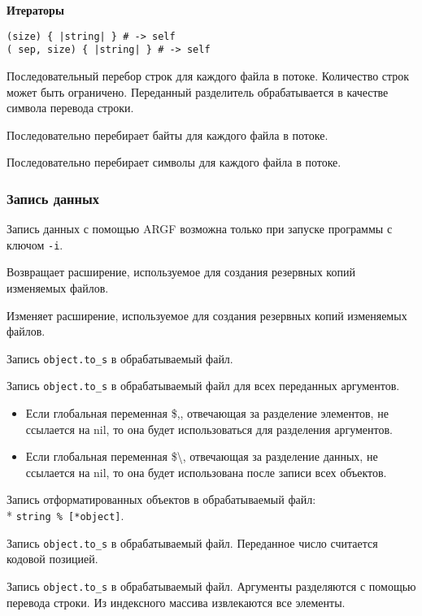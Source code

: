 {\bf Итераторы}

\begin{methodlist}
  \verb!(size) { |string| } # -> self!
  \\\verb!( sep, size) { |string| } # -> self!

  Последовательный перебор строк для каждого файла в потоке. Количество строк может быть ограничено. Переданный разделитель обрабатывается в качестве символа перевода строки.
 
  Последовательно перебирает байты для каждого файла в потоке. 

  Последовательно перебирает символы для каждого файла в потоке.
\end{methodlist}

\subsubsection{Запись данных}

Запись данных с помощью ARGF возможна только при запуске программы с ключом \verb!-i!.

\begin{methodlist}
  Возвращает расширение, используемое для создания резервных копий изменяемых файлов.

  Изменяет расширение, используемое для создания резервных копий изменяемых файлов.

  Запись \verb!object.to_s! в обрабатываемый файл.

  Запись \verb!object.to_s! в обрабатываемый файл для всех переданных аргументов.
  \begin{itemize}
    \item Если глобальная переменная \$,, отвечающая за разделение элементов, не ссылается на nil, то она будет использоваться для разделения аргументов. 
    \item Если глобальная переменная \$\textbackslash, отвечающая за разделение данных, не ссылается на nil, то она будет использована после записи всех объектов. 
  \end{itemize}
 
  Запись отформатированных объектов в обрабатываемый файл: \\* \verb!string % [*object]!. 
   
  Запись \verb!object.to_s! в обрабатываемый файл. Переданное число считается кодовой позицией.
 
  Запись \verb!object.to_s! в обрабатываемый файл. Аргументы разделяются с помощью перевода строки. Из индексного массива извлекаются все элементы.
\end{methodlist}